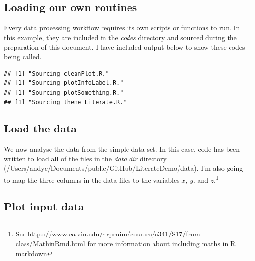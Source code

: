 \documentclass[11pt,]{article}
\newenvironment{Shaded}{\begin{snugshade}}{\end{snugshade}}
\newcommand{\CharTok}[1]{\textcolor[rgb]{0.31,0.60,0.02}{#1}}
\newcommand{\CommentTok}[1]{\textcolor[rgb]{0.56,0.35,0.01}{\textit{#1}}}
\newcommand{\ControlFlowTok}[1]{\textcolor[rgb]{0.13,0.29,0.53}{\textbf{#1}}}
\newcommand{\DataTypeTok}[1]{\textcolor[rgb]{0.13,0.29,0.53}{#1}}
\newcommand{\KeywordTok}[1]{\textcolor[rgb]{0.13,0.29,0.53}{\textbf{#1}}}
\newcommand{\NormalTok}[1]{#1}
\newcommand{\StringTok}[1]{\textcolor[rgb]{0.31,0.60,0.02}{#1}}
\let\rmarkdownfootnote\footnote%
\def\footnote{\protect\rmarkdownfootnote}
\begin{document}
\hypertarget{loading-our-own-routines}{%
\subsection{Loading our own routines}\label{loading-our-own-routines}}

Every data processing workflow requires its own scripts or functions to run. In this example, they are included in the \emph{codes} directory and sourced during the preparation of this document. I have included output below to show these codes being called.

\begin{Shaded}
\end{Shaded}

\begin{verbatim}
## [1] "Sourcing cleanPlot.R."
## [1] "Sourcing plotInfoLabel.R."
## [1] "Sourcing plotSomething.R."
## [1] "Sourcing theme_Literate.R."
\end{verbatim}

\hypertarget{load-the-data}{%
\subsection{Load the data}\label{load-the-data}}

We now analyse the data from the simple data set. In this case, code has been written to load all of the files in the \emph{data.dir} directory (/Users/andyc/Documents/public/GitHub/LiterateDemo/data). I'm also going to map the three columns in the data files to the variables \(x\), \(y\), and \(z\).\footnote{See \url{https://www.calvin.edu/~rpruim/courses/s341/S17/from-class/MathinRmd.html} for more information about including maths in R markdown}

\hypertarget{plot-input-data}{%
\subsection{Plot input data}\label{plot-input-data}}
\end{document}
